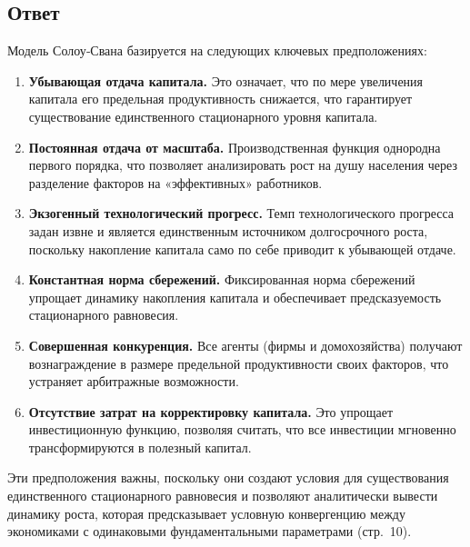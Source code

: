 \subsection*{Ответ}
Модель Солоу‑Свана базируется на следующих ключевых предположениях:
\begin{enumerate}
  \item \textbf{Убывающая отдача капитала.} Это означает, что по мере увеличения капитала его предельная продуктивность 
  снижается, что гарантирует существование единственного стационарного уровня капитала.
  \item \textbf{Постоянная отдача от масштаба.} Производственная функция однородна первого порядка, что позволяет анализировать
   рост на душу населения через разделение факторов на «эффективных» работников.
  \item \textbf{Экзогенный технологический прогресс.} Темп технологического прогресса задан извне и является единственным источником 
  долгосрочного роста, поскольку накопление капитала само по себе приводит к убывающей отдаче.
  \item \textbf{Константная норма сбережений.} Фиксированная норма сбережений упрощает динамику накопления капитала и обеспечивает 
  предсказуемость стационарного равновесия.
  \item \textbf{Совершенная конкуренция.} Все агенты (фирмы и домохозяйства) получают вознаграждение в размере предельной продуктивности своих 
  факторов, что устраняет арбитражные возможности.
  \item \textbf{Отсутствие затрат на корректировку капитала.} Это упрощает инвестиционную функцию, позволяя считать, что все инвестиции 
  мгновенно трансформируются в полезный капитал.
\end{enumerate}
Эти предположения важны, поскольку они создают условия для существования единственного стационарного равновесия и позволяют аналитически
 вывести динамику роста, которая предсказывает условную конвергенцию между экономиками с одинаковыми фундаментальными параметрами 
 (стр.~10).

